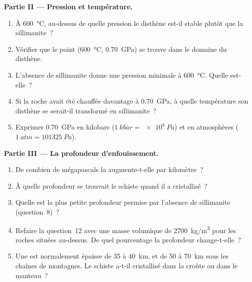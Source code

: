 \begin{problem}
\medskip
\noindent\textbf{Partie II --- Pression et température.}
\begin{enumerate}[resume]
  \item À \qty{600}{\celsius}, au-dessus de quelle pression le disthène
        est-il stable plutôt que la sillimanite~?
  \item Vérifier que le point (\qty{600}{\celsius}, \qty{0.70}{GPa}) se
        trouve dans le domaine du disthène.
  \item L'absence de sillimanite donne une pression minimale à
        \qty{600}{\celsius}. Quelle est-elle~?
  \item Si la roche avait été chauffée davantage à \qty{0.70}{GPa}, à quelle
        température son disthène se serait-il transformé en sillimanite~?
  \item Exprimer \qty{0.70}{GPa} en kilobars ($\qty{1}{kbar} =
        \qty{e8}{Pa}$) et en atmosphères ($\qty{1}{atm} = \qty{101325}{Pa}$).
\end{enumerate}

\medskip
\noindent\textbf{Partie III --- La profondeur d'enfouissement.}
\begin{enumerate}[resume]
  \item De combien de mégapascals la  augmente-t-elle
        par kilomètre~?
  \item À quelle profondeur se trouvait le schiste quand il a cristallisé~?
  \item Quelle est la plus petite profondeur permise par l'absence de
        sillimanite (question~8)~?
  \item Refaire la question~12 avec une masse volumique de
        \qty{2700}{kg/m^3} pour les roches situées au-dessus. De quel
        pourcentage la profondeur change-t-elle~?
  \item Une  est normalement épaisse de 35 à
        \qty{40}{km}, et de 50 à \qty{70}{km} sous les chaînes de montagnes.
        Le schiste a-t-il cristallisé dans la croûte ou dans le manteau~?
\end{enumerate}


\end{problem}
